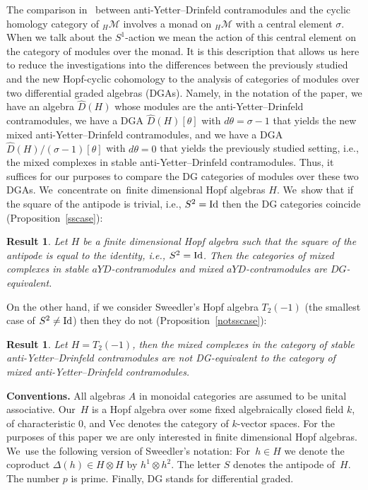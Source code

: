 \documentclass[pdftex]{sigma}
\numberwithin{equation}{section}
\newtheorem{prop}[Theorem]{Result}
 { \theoremstyle{definition}
\newtheorem{Definition}[Theorem]{Definition}
\newtheorem{Note}[Theorem]{Note}
\newtheorem{Example}[Theorem]{Example}
\newtheorem{Remark}[Theorem]{Remark} }
\newcommand{\hmod}{{_H\mathcal{M}}}
\newcommand{\vect}{\text{Vec}}
\newcommand{\ot}{\otimes}
\begin{document}
The comparison in~\cite{chern} between anti-Yetter--Drinfeld contramodules and the cyclic homology category of $\hmod$ involves a monad on $\hmod$ with a central element $\sigma$. When we talk about the $S^1$-action we mean the action of this central element on the category of modules over the monad. It is this description that allows us here to reduce the investigations into the differences between the previously studied and the new Hopf-cyclic cohomology to the analysis of categories of modules over two differential graded algebras (DGAs). Namely, in the notation of the paper, we have an algebra $\widehat{D}(H)$ whose modules are the anti-Yetter--Drinfeld contramodules, we have a DGA $\widehat{D}(H)[\theta]$ with $d\theta=\sigma-1$ that yields the new mixed anti-Yetter--Drinfeld contramodules, and we have a DGA $\widehat{D}(H)/(\sigma-1)[\theta]$ with $d\theta=0$ that yields the previously studied setting, i.e., the mixed complexes in stable anti-Yetter--Drinfeld contramodules. Thus, it suffices for our purposes to compare the DG categories of modules over these two DGAs. We~concentrate on~finite dimensional Hopf algebras $H$. We~show that if the square of the antipode is trivial, i.e., $S^2={\rm Id}$ then the DG categories coincide (Proposition~\ref{sscase}):
\begin{prop}
Let $H$ be a finite dimensional Hopf algebra such that the square of the antipode is equal to the identity, i.e., $S^2={\rm Id}$. Then the categories of mixed complexes in stable $aYD$-contramodules and mixed $aYD$-contramodules are $DG$-equivalent.
\end{prop} On the other hand, if we consider Sweedler's Hopf algebra $T_2(-1)$ (the smallest case of $S^2\neq {\rm Id}$) then they do not (Proposition~\ref{notsscase}):
\begin{prop}
Let $H=T_2(-1)$, then the mixed complexes in the category of stable anti-Yetter--Drinfeld contramodules are not DG-equivalent to the category of mixed anti-Yetter--Drinfeld contramodules.
\end{prop}

\noindent \textbf{Conventions.} All algebras $A$ in monoidal categories are assumed to be unital associative. Our~$H$ is a Hopf algebra over some fixed algebraically closed field $k$, of characteristic $0$, and $\vect$ denotes the category of $k$-vector spaces. For the purposes of this paper we are only interested in finite dimensional Hopf algebras. We~use the following version of Sweedler's notation: For~$h\in H$ we denote the coproduct $\Delta(h)\in H\ot H$ by $h^1\ot h^2$. The letter $S$ denotes the antipode of~$H$. The number $p$ is prime. Finally, DG stands for differential graded.
\end{document}
